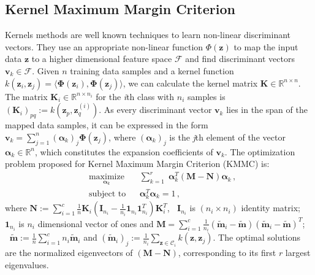 \documentclass[runningheads]{llncs}
\begin{document}
\subsection{Kernel Maximum Margin Criterion}
\label{ssec:KMMC}
Kernels methods are well known techniques to learn non-linear discriminant vectors. They use an appropriate non-linear function $\Phi(\mathbf{z})$ to map the input data $\mathbf{z}$ to a higher dimensional feature space $\mathcal{F}$ and find discriminant vectors $\mathbf{v}_k \in \mathcal{F}$. Given $n$ training data samples and a kernel function $k(\mathbf{z}_i, \mathbf{z}_j) = \langle \mathbf{\Phi}(\mathbf{z}_i), \mathbf{\Phi}(\mathbf{z}_j) \rangle $, we can calculate the kernel matrix $\mathbf{K}\in \mathbb{R}^{n \times n}$. The matrix $\mathbf{K}_i \in \mathbb{R}^{n \times n_i}$
for the \textit{i}th class with $n_i$ samples is $(\mathbf{K}_i)_{pq}:=k(\mathbf{z}_p,\mathbf{z}_q^{(i)})$. As every discriminant vector $\mathbf{v}_k$ lies in the span of the mapped data samples, it can be expressed in the form $\mathbf{v}_k = \sum _{j=1}^{n} (\bm{\alpha}_{k})_j \mathbf{\Phi}(\mathbf{z}_j)$,
where $(\bm{\alpha}_{k})_j$ is the \textit{j}th element of the vector $\bm{\alpha}_{k} \in \mathbb{R}^{n}$, which constitutes the expansion coefficients of $\mathbf{v}_k$. 
The optimization problem proposed for Kernel Maximum Margin Criterion (KMMC)\cite{haifeng:mmc} is:
\begin{equation}
\begin{aligned}
& \underset{\bm{\alpha}_{k}}{\text{maximize}} & & \sum\limits_{k=1}^r \;  \bm{\alpha}^T_{k} (\mathbf{M}  -  \mathbf{N}) \bm{\alpha}_{k} \,,\\
\label{eqn:KMMCFinal}
& \text{subject to}     & & \bm{\alpha}^T_{k} \bm{\alpha}_{k} = 1 \,,
\end{aligned}
\end{equation}
where $\mathbf{N}:= \sum_{i = 1}^{c} \frac{1}{n} \mathbf{K}_i(\mathbf{I}_{n_i}- \frac{1}{n_i} \mathbf{1}_{n_i}\mathbf{1}_{n_i}^T)\mathbf{K}_i^T$, 
$\;\; \mathbf{I}_{n_i}$ is $(n_i \times n_i)$ identity matrix; $\mathbf{1}_{n_i}$ is $n_i$ dimensional vector of ones and
$\mathbf{M}=\sum_{i = 1}^{c} \frac{1}{n_i} (\widetilde{\mathbf{m}}_i-\widetilde{\mathbf{m}})(\widetilde{\mathbf{m}}_i- \widetilde{\mathbf{m}})^T$;
$\;\;\widetilde{\mathbf{m}} := \frac{1}{n} \sum_{i=1}^{c} n_i \widetilde{\mathbf{m}}_i$ and $(\widetilde{\mathbf{m}}_i)_j := \frac{1}{n_i}  \sum_{\mathbf{z} \in \mathcal{C}_i}    k(\mathbf{z},\mathbf{z}_j)$.
 The optimal solutions are the normalized eigenvectors of ${(\mathbf{M} - \mathbf{N})}$, corresponding to its first $r$ largest eigenvalues. 
\end{document}
